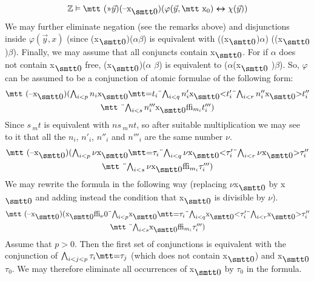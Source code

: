 \begin{equation}
\BZ \vDash \mbox{\mtt (\symbol{20}$\vec{y}$)(\symbol{21}x$_{\snull}$%
)($\varphi(\vec{y},\mbox{\mtt x}_0)\boldsymbol{\dpf}\chi(\vec{y})$)}
\end{equation}
We may further eliminate negation (see the remarks above) 
and disjunctions inside $\varphi(\vec{y},x)$ (since 
{\mtt (x$_{\snull}$)($\alpha$$\beta$)} is 
equivalent with {\mtt ((x$_{\snull}$)$\alpha$)%
((x$_{\snull}$)$\beta$)}. Finally, we may assume that all 
conjuncts contain {\mtt x$_{\snull}$}. For if $\alpha$ does not contain 
{\mtt x$_{\snull}$} free, {\mtt (x$_{\snull}$)($\alpha$%
$\beta$)} is equivalent to {\mtt ($\alpha$(x$_{\snull}$%
)$\beta$)}. So, $\varphi$ can be assumed to be a conjunction 
of atomic formulae of the following form: 
\begin{multline}
\mbox{\mtt (\symbol{21}x$_{\snull}$)($\gund_{i < p} n_i$x$_{\snull}$%
\mbox{\mtt\symbol{61}}$t_i$\symbol{4}$\gund_{i < q} 
n'_i$x$_{\snull}$<$t'_i$\symbol{4}$\gund_{i < r} n''_i$x$_{\snull}$>$t''_i$}
\\
\mbox{\mtt \symbol{4}$\gund_{i < s} n'''_i$x$_{\snull}$\symbol{30}$_{m_i}%
t'''_i$)}
\end{multline}
Since {\mtt $s\,$$_mt$} is equivalent with 
{\mtt $ns\,$$_m nt$}, so after suitable 
multiplication we may see to it that all the $n_i$, $n'_i$, $n''_i$ 
and $n'''_i$ are the same number $\nu$. 
\begin{multline}
\mbox{\mtt (\symbol{21}x$_{\snull}$)($\gund_{i < p} \nu$x$_{\snull}$%
\mbox{\mtt\symbol{61}}$\tau_i$\symbol{4}%
$\gund_{i < q} \nu$x$_{\snull}$<$\tau'_i$\symbol{4}%
$\gund_{i < r} \nu$x$_{\snull}$>$\tau''_i$} \\
\mbox{\mtt \symbol{4}$\gund_{i < s}\nu$x$_{\snull}%
$\symbol{30}$_{m_i} \tau'''_i$)}
\end{multline}
We may rewrite the formula in the following way (replacing 
{\mtt $\nu$x$_{\snull}$} by {\mtt x$_{\snull}$} and adding 
instead the condition that {\mtt x$_{\snull}$} is divisible by $\nu$). 
\begin{multline}
\mbox{\mtt (\symbol{21}x$_{\snull}$)(x$_{\snull}$\symbol{30}$_{\nu}%
$0\symbol{4}%
$\gund_{i < p}$x$_{\snull}$\mbox{\mtt\symbol{61}}$\tau_i$\symbol{4}%
$\gund_{i < q}$x$_{\snull}$<$\tau'_i$\symbol{4}%
$\gund_{i < r}$x$_{\snull}$>$\tau''_i$} \\%
\mbox{\mtt \symbol{4}$\gund_{i < s}$x$_{\snull}$\symbol{30}$_{m_i}\tau'''_i$)}
\end{multline}
Assume that $p > 0$. Then the first set of conjunctions is equivalent 
with the conjunction of 
$\gund_{i < j < p} \tau_i\mbox{\mtt\symbol{61}}\tau_j$ (which 
does not contain {\mtt x$_{\snull}$}) and 
{\mtt x$_{\snull}$\mbox{}$\tau_0$}. We may therefore 
eliminate all occurrences of {\mtt x$_{\snull}$} by $\tau_0$ in 
the formula. 

